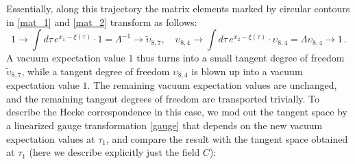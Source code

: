 \documentclass[10pt]{article}
\theoremstyle{definition}
\numberwithin{equation}{section}
\begin{document}
Essentially, along this trajectory the matrix elements marked by circular contours in \eqref{mat_1} and \eqref{mat_2} transform as follows: 
\begin{equation}
	1\to \int d\tau\, e^{x_1-\xi(\tau)}\cdot 1=\Lambda^{-1}\to \tilde\upsilon_{8,7},\quad \upsilon_{8,4}\to \int d\tau\, e^{x_2-\xi(\tau)}\cdot \upsilon_{8,4}=\Lambda \upsilon_{8,4}\to 1\,.
\end{equation}
A vacuum expectation value $1$ thus turns into a small tangent degree of freedom $\tilde\upsilon_{8,7}$, while a tangent degree of freedom $\upsilon_{8,4}$ is blown up into a vacuum expectation value $1$.
The remaining vacuum expectation values are unchanged, and the remaining tangent degrees of freedom are transported trivially.
To describe the Hecke correspondence in this case, we mod out the tangent space by a linearized gauge transformation \eqref{gauge} that depends on the new vacuum expectation values at $\tau_1$, and compare the result with the tangent space obtained at $\tau_1$ (here we describe explicitly just the field $C$):
\end{document}
